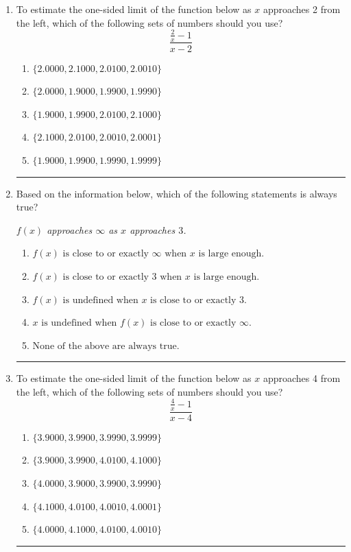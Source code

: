 \documentclass[14pt]{extbook}
\newcommand{\litem}[1]{\item#1\hspace*{-1cm}\rule{\textwidth}{0.4pt}}
\begin{document}
\begin{enumerate}
\litem{
To estimate the one-sided limit of the function below as $x$ approaches 2 from the left, which of the following sets of numbers should you use?\[ \frac{\frac{2}{x} - 1}{x - 2} \]\begin{enumerate}[label=\Alph*.]
\item \( \{ 2.0000, 2.1000, 2.0100, 2.0010 \} \)
\item \( \{ 2.0000, 1.9000, 1.9900, 1.9990 \} \)
\item \( \{ 1.9000, 1.9900, 2.0100, 2.1000 \} \)
\item \( \{ 2.1000, 2.0100, 2.0010, 2.0001 \} \)
\item \( \{ 1.9000, 1.9900, 1.9990, 1.9999 \} \)

\end{enumerate} }
\litem{
Based on the information below, which of the following statements is always true?
\begin{center}
    \textit{ $f(x)$ approaches $\infty$ as $x$ approaches $3$. }
\end{center}
\begin{enumerate}[label=\Alph*.]
\item \( f(x) \text{ is close to or exactly } \infty \text{ when } x \text{ is large enough}. \)
\item \( f(x) \text{ is close to or exactly } 3 \text{ when } x \text{ is large enough}. \)
\item \( f(x) \text{ is undefined when } x \text{ is close to or exactly } 3. \)
\item \( x \text{ is undefined when } f(x) \text{ is close to or exactly } \infty. \)
\item \( \text{None of the above are always true.} \)

\end{enumerate} }
\litem{
To estimate the one-sided limit of the function below as $x$ approaches 4 from the left, which of the following sets of numbers should you use?\[ \frac{\frac{4}{x} - 1}{x - 4} \]\begin{enumerate}[label=\Alph*.]
\item \( \{ 3.9000, 3.9900, 3.9990, 3.9999 \} \)
\item \( \{ 3.9000, 3.9900, 4.0100, 4.1000 \} \)
\item \( \{ 4.0000, 3.9000, 3.9900, 3.9990 \} \)
\item \( \{ 4.1000, 4.0100, 4.0010, 4.0001 \} \)
\item \( \{ 4.0000, 4.1000, 4.0100, 4.0010 \} \)


\end{enumerate}}
\end{enumerate}
\end{document}
